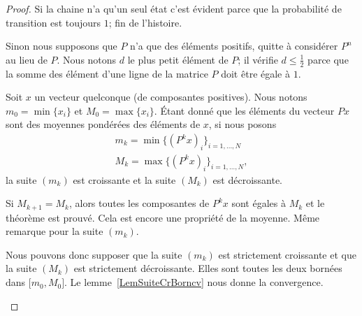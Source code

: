 \begin{proof}
	Si la chaine n'a qu'un seul état c'est évident parce que la probabilité de transition est toujours \( 1\); fin de l'histoire.

	\begin{subproof}
		\spitem[Hypothèse]

		Sinon nous supposons que \( P\) n'a que des éléments positifs, quitte à considérer \( P^n\) au lieu de \( P\). Nous notons \( d\) le plus petit élément de \( P\); il vérifie \( d\leq \frac{ 1 }{2}\) parce que la somme des élément d'une ligne de la matrice \( P\) doit être égale à \( 1\).


		Soit \( x\) un vecteur quelconque (de composantes positives). Nous notons \( m_0=\min\{ x_i \}\) et \( M_0=\max\{ x_i \}\). Étant donné que les éléments du vecteur \( Px\) sont des moyennes pondérées des éléments de \( x\), si nous posons
		\begin{subequations}
			\begin{align}
				m_k=\min\{ (P^kx)_i \}_{i=1,\ldots, N} \\
				M_k=\max\{ (P^kx)_i \}_{i=1,\ldots, N},
			\end{align}
		\end{subequations}
		la suite \( (m_k)\) est croissante et la suite \( (M_k)\) est décroissante.


		Si \( M_{k+1}=M_k\), alors toutes les composantes de \( P^kx\) sont égales à \( M_k\) et le théorème est prouvé. Cela est encore une propriété de la moyenne. Même remarque pour la suite \( (m_k)\).

		Nous pouvons donc supposer que la suite \( (m_k)\) est strictement croissante et que la suite \( (M_k)\) est strictement décroissante. Elles sont toutes les deux bornées dans \( \mathopen[ m_0 , M_0 \mathclose]\). Le lemme~\ref{LemSuiteCrBorncv} nous donne la convergence.



\end{subproof}
\end{proof}
